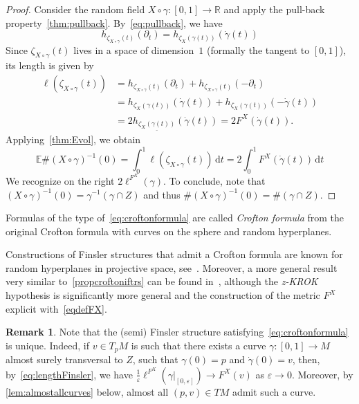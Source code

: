 \documentclass[10pt]{amsart}
\theoremstyle{definition}\newtheorem{defi}[theo]{Definition}\newtheorem{rema}[theo]{Remark}\newtheorem{exam}[theo]{Example}\newtheorem{exem}[theo]{Example}\newtheorem{nota}[theo]{Notation}
\newcommand{\R}{\mathbb{R}}
\newcommand{\EE}{\mathbb{E}}
\newcommand{\dd}{\mathrm{d}}
\newcommand{\seg}{\underline}
\newcommand{\zkrok}{\emph{z-KROK}\xspace}
\newcommand{\eps}{\varepsilon}
\begin{document}
\begin{proof}
Consider the random field $X\circ\gamma:[0,1]\to \R$ and apply the pull-back property~\cref{thm:pullback}. By~\eqref{eq:pullback}, we have
\begin{equation}\label{eq:zetaXgamma}
h_{\zeta_{X\circ\gamma}(t)}(\partial_t)=h_{\zeta_X(\gamma(t))}(\dot{\gamma}(t))
\end{equation}
Since $\zeta_{X\circ \gamma}(t)$ lives in a space of dimension~$1$ (formally the tangent to $[0,1]$), its length is given by
\begin{align*}
\ell(\zeta_{X\circ\gamma}(t)) &=h_{\zeta_{X\circ\gamma}(t)}(\partial_t)+h_{\zeta_{X\circ\gamma}(t)}(-\partial_t) \\
&=h_{\zeta_X(\gamma(t))}(\dot{\gamma}(t))+h_{\zeta_X(\gamma(t))}(-\dot{\gamma}(t))\\
&=2h_{\seg{\zeta_X(\gamma(t))}}(\dot{\gamma}(t))=2 F^X(\dot\gamma(t)).
\end{align*}
Applying~\cref{thm:Evol}, we obtain
\begin{equation*}
\EE\#(X\circ\gamma)^{-1}(0)=\int_0^1 \ell\left(\zeta_{X\circ\gamma}(t)\right)\, \dd t=2\int_0^1 F^X(\dot{\gamma}(t))\, \dd t
\end{equation*}
We recognize on the right $2\ell^{F^X}(\gamma).$ To conclude, note that $(X\circ\gamma)^{-1}(0)=\gamma^{-1}(\gamma\cap Z)$ and thus $\#(X\circ\gamma)^{-1}(0)=\#(\gamma\cap Z)$.
\end{proof}

Formulas of the type of~\eqref{eq:croftonformula} are called \emph{Crofton formula} from the original Crofton formula with curves on the sphere and random hyperplanes.


Constructions of Finsler structures that admit a Crofton formula are known for random hyperplanes in projective space, see~\cite{BernigCrofton,PaivaGelfCrof,
SchneiderCrofton}. Moreover, a more general result very similar to~\cref{propcroftoniftrs} can be found in~\cite[Theorem~A]{paivageod}, although the {\zkrok} hypothesis is significantly more general and the construction of the metric $F^X$ explicit with~\eqref{eqdefFX}.

\begin{rema}
Note that the (semi) Finsler structure satisfying~\eqref{eq:croftonformula} is unique. Indeed, if $v\in T_pM$ is such that there exists a curve $\gamma:[0,1]\to M$ almost surely transversal to $Z$, such that $\gamma(0)=p$ and $\dot\gamma(0)=v$, then, by~\eqref{eq:lengthFinsler}, we have $\tfrac{1}{\eps}\ell^{F^X}(\gamma|_{[0,\eps]})\to F^X(v)$ as $\eps\to 0.$ Moreover, by
\cref{lem:almostallcurves} below, almost all $(p,v)\in TM$ admit such a curve.
\end{rema}
\end{document}

